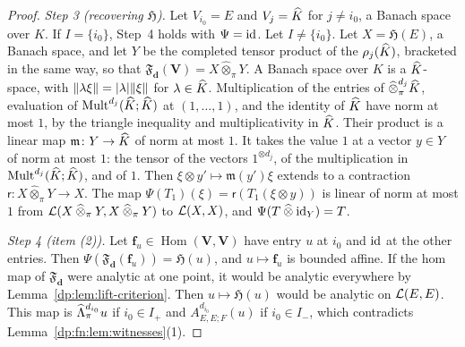 \begin{proof}
\emph{Step 3 (recovering $\mathfrak H$).} Let $V_{i_0}=E$ and $V_j=\widehat K$ for $j\ne i_0$, a Banach space over $K$. If $I=\{i_0\}$, Step~4 holds with $\Psi=\mathrm{id}$. Let $I\ne\{i_0\}$. Let $X=\mathfrak H(E)$, a Banach space, and let $Y$ be the completed tensor product of the $\rho_j(\widehat K)$, bracketed in the same way, so that $\mathfrak F_{\mathbf d}(\mathbf V)=X\mathbin{\widehat\otimes_\pi}Y$. A Banach space over $K$ is a $\widehat K$-space, with $\lVert \lambda\xi\rVert=\lvert \lambda\rvert\lVert \xi\rVert$ for $\lambda\in\widehat K$. Multiplication of the entries of $\mathbin{\widehat\otimes}^{d_j}_\pi\widehat K$, evaluation of $\operatorname{Mult}^{d_j}(\widehat K;\widehat K)$ at $(1,\dots,1)$, and the identity of $\widehat K$ have norm at most $1$, by the triangle inequality and multiplicativity in $\widehat K$. Their product is a linear map $\mathfrak m\colon Y\to\widehat K$ of norm at most $1$. It takes the value $1$ at a vector $y\in Y$ of norm at most $1$: the tensor of the vectors $1^{\otimes d_j}$, of the multiplication in $\operatorname{Mult}^{d_j}(\widehat K;\widehat K)$, and of $1$. Then $\xi\otimes y'\mapsto\mathfrak m(y')\xi$ extends to a contraction $\mathsf r\colon X\mathbin{\widehat\otimes_\pi}Y\to X$. The map $\Psi(T_1)(\xi)=\mathsf r(T_1(\xi\otimes y))$ is linear of norm at most $1$ from $\mathcal L(X\mathbin{\widehat\otimes_\pi}Y,X\mathbin{\widehat\otimes_\pi}Y)$ to $\mathcal L(X,X)$, and $\Psi(T\mathbin{\widehat\otimes}\mathrm{id}_Y)=T$.

\emph{Step 4 (item (2)).} Let $\mathbf f_u\in\operatorname{Hom}(\mathbf V,\mathbf V)$ have entry $u$ at $i_0$ and $\mathrm{id}$ at the other entries. Then $\Psi(\mathfrak F_{\mathbf d}(\mathbf f_u))=\mathfrak H(u)$, and $u\mapsto\mathbf f_u$ is bounded affine. If the hom map of $\mathfrak F_{\mathbf d}$ were analytic at one point, it would be analytic everywhere by Lemma~\ref{dp:lem:lift-criterion}. Then $u\mapsto\mathfrak H(u)$ would be analytic on $\mathcal L(E,E)$. This map is $\widehat\Lambda^{d_{i_0}}_\pi u$ if $i_0\in I_+$ and $A^{d_{i_0}}_{E,E;F}(u)$ if $i_0\in I_-$, which contradicts Lemma~\ref{dp:fn:lem:witnesses}(1).
\end{proof}

